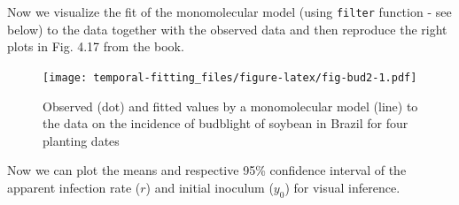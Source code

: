 \documentclass[
  letterpaper,
]{book}
\newenvironment{Shaded}{\begin{snugshade}}{\end{snugshade}}
\newcommand{\AttributeTok}[1]{\textcolor[rgb]{0.40,0.45,0.13}{#1}}
\newcommand{\CommentTok}[1]{\textcolor[rgb]{0.37,0.37,0.37}{#1}}
\newcommand{\DecValTok}[1]{\textcolor[rgb]{0.68,0.00,0.00}{#1}}
\newcommand{\FloatTok}[1]{\textcolor[rgb]{0.68,0.00,0.00}{#1}}
\newcommand{\FunctionTok}[1]{\textcolor[rgb]{0.28,0.35,0.67}{#1}}
\newcommand{\NormalTok}[1]{\textcolor[rgb]{0.00,0.23,0.31}{#1}}
\newcommand{\SpecialCharTok}[1]{\textcolor[rgb]{0.37,0.37,0.37}{#1}}
\newcommand{\StringTok}[1]{\textcolor[rgb]{0.13,0.47,0.30}{#1}}
\begin{document}
Now we visualize the fit of the monomolecular model (using
\texttt{filter} function - see below) to the data together with the
observed data and then reproduce the right plots in Fig. 4.17 from the
book.

\begin{Shaded}
\end{Shaded}

\begin{figure}

{\centering \texttt{[image: temporal-fitting\_files/figure-latex/fig-bud2-1.pdf]}

}

\caption{\label{fig-bud2}Observed (dot) and fitted values by a
monomolecular model (line) to the data on the incidence of budblight of
soybean in Brazil for four planting dates}

\end{figure}

Now we can plot the means and respective 95\% confidence interval of the
apparent infection rate (\(r\)) and initial inoculum (\(y_0\)) for
visual inference.
\end{document}
